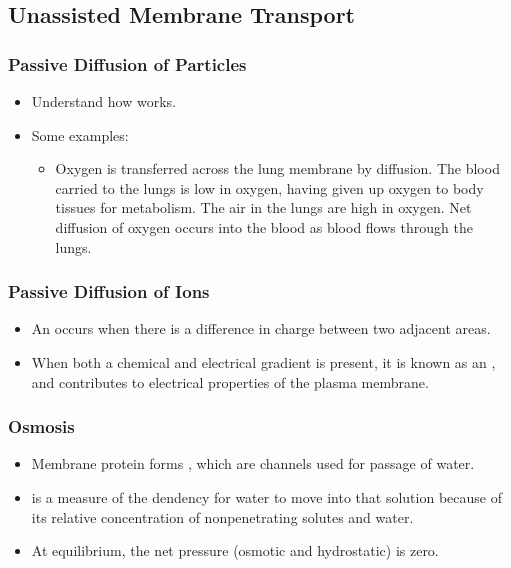\documentclass{article}
\numberwithin{equation}{section}
\begin{document}
\subsection{Unassisted Membrane Transport}
\subsubsection{Passive Diffusion of Particles}
\begin{itemize}
    \item Understand how  works.
    \item Some examples:
    \begin{itemize}
        \item Oxygen is transferred across the lung membrane by diffusion. The blood carried to the lungs is low in oxygen, having given up oxygen to body tissues for metabolism. The air in the lungs are high in oxygen. Net diffusion of oxygen occurs into the blood as blood flows through the lungs.
    \end{itemize}
\end{itemize}
\subsubsection{Passive Diffusion of Ions}
\begin{itemize}
    \item An  occurs when there is a difference in charge between two adjacent areas.
    \item When both a chemical and electrical gradient is present, it is known as an , and contributes to electrical properties of the plasma membrane.
\end{itemize}
\subsubsection{Osmosis}
\begin{itemize}
    \item Membrane protein forms , which are channels used for passage of water.
    \item {} is a measure of the dendency for water to move into that solution because of its relative concentration of nonpenetrating solutes and water.
    \item At equilibrium, the net pressure (osmotic and hydrostatic) is zero.
\end{itemize}
\end{document}
